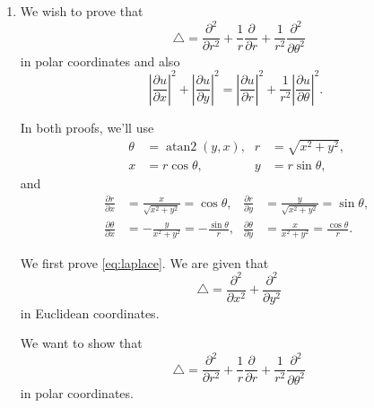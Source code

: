 \documentclass[oneside]{article}
\newcommand\abs[1]{\left|#1\right|}
\newcommand*\Laplace{\mathop{}\!\mathbin\bigtriangleup}
\DeclareMathOperator{\atantwo}{atan2}
\begin{document}
\begin{enumerate}[label=\textbf{\arabic*.}]
  \item
  We wish to prove that\begin{equation}
  \label{eq:laplace}
  \Laplace = \frac{\partial^2}{\partial r^2}
             + \frac{1}{r}\frac{\partial}{\partial r}
             + \frac{1}{r^2}\frac{\partial^2}{\partial\theta^2}
\end{equation}in polar coordinates and also\begin{equation}
  \label{eq:other-thing}
  \abs{\frac{\partial u}{\partial x}}^2
  + \abs{\frac{\partial u}{\partial y}}^2
  = \abs{\frac{\partial u}{\partial r}}^2
  + \frac{1}{r^2}\abs{\frac{\partial u}{\partial\theta}}^2 \text{.}
\end{equation}

In both proofs, we'll use\begin{align*}
  \theta &= \atantwo(y, x) \text{,}&
   r &= \sqrt{x^2 + y^2} \text{,} \\
  x &= r\cos\theta \text{,}&
   y &= r\sin\theta \text{,}
\end{align*}and\begin{align*}
  \frac{\partial r}{\partial x}
  &= \frac{x}{\sqrt{x^2+y^2}}
  = \cos\theta\text{,}&
  \frac{\partial r}{\partial y}
  &= \frac{y}{\sqrt{x^2+y^2}}
  = \sin\theta\text{,}
  \\
  \frac{\partial\theta}{\partial x}
  &= -\frac{y}{x^2 + y^2}
  = -\frac{\sin\theta}{r} \text{,}&
  \frac{\partial\theta}{\partial y}
  &= \frac{x}{x^2 + y^2}
  = \frac{\cos\theta}{r} \text{.}
\end{align*}

We first prove \cref{eq:laplace}. We are given that \[
  \Laplace = \frac{\partial^2}{\partial x^2} + \frac{\partial^2}{\partial y^2}
\] in Euclidean coordinates.

We want to show that \[
  \Laplace = \frac{\partial^2}{\partial r^2}
             + \frac{1}{r}\frac{\partial}{\partial r}
             + \frac{1}{r^2}\frac{\partial^2}{\partial\theta^2}
\] in polar coordinates.


\end{enumerate}
\end{document}
